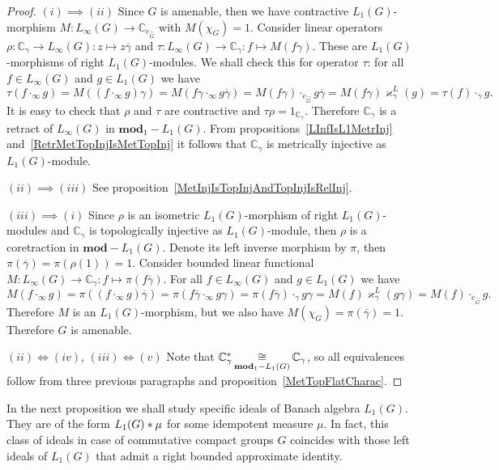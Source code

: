 \begin{proof} $(i)\implies (ii)$ Since $G$ is amenable, then we have
contractive $L_1(G)$-morphism $M:L_\infty(G)\to\mathbb{C}_{e_{\widehat{G}}}$
with $M(\chi_G)=1$. Consider linear 
operators $\rho:\mathbb{C}_\gamma\to L_\infty(G):z\mapsto z\overline{\gamma}$ 
and $\tau:L_\infty(G)\to\mathbb{C}_\gamma:f\mapsto M(f\gamma)$. These are
$L_1(G)$-morphisms of right $L_1(G)$-modules. We shall check this for operator
$\tau$: for all $f\in L_\infty(G)$ and $g\in L_1(G)$ we have
$$
\tau(f\cdot_\infty g)
=M((f\cdot_\infty g)\gamma)
=M(f\gamma\cdot_\infty g\overline{\gamma})
=M(f\gamma)\cdot_{e_{\widehat{G}}} g\overline{\gamma}
=M(f\gamma)\varkappa_\gamma^L(g)
=\tau(f)\cdot_{\gamma} g.
$$  
It is easy to check that $\rho$ and $\tau$ are contractive and
$\tau\rho=1_{\mathbb{C}_\gamma}$. Therefore $\mathbb{C}_\gamma$ is a retract of
$L_\infty(G)$ in $\mathbf{mod}_1-L_1(G)$. From
propositions~\ref{LInfIsL1MetrInj} and~\ref{RetrMetTopInjIsMetTopInj} it follows
that $\mathbb{C}_\gamma$ is metrically injective as $L_1(G)$-module.

$(ii)\implies (iii)$ See proposition~\ref{MetInjIsTopInjAndTopInjIsRelInj}.

$(iii) \implies (i)$ Since $\rho$ is an isometric $L_1(G)$-morphism of right
$L_1(G)$-modules and $\mathbb{C}_\gamma$ is topologically injective as
$L_1(G)$-module, then $\rho$ is a coretraction in $\mathbf{mod}-L_1(G)$. Denote
its left inverse morphism by $\pi$, then
$\pi(\overline{\gamma})=\pi(\rho(1))=1$. Consider bounded linear functional
$M:L_\infty(G)\to\mathbb{C}_\gamma:f\mapsto \pi(f\overline{\gamma})$. For all
$f\in L_\infty(G)$ and $g\in L_1(G)$ we have
$$
M(f\cdot_\infty g)
=\pi((f\cdot_\infty g)\overline{\gamma})
=\pi(f\overline{\gamma}\cdot_\infty g\gamma)
=\pi(f\overline{\gamma})\cdot_{\gamma} g\gamma
=M(f)\varkappa_\gamma^L(g\gamma)
=M(f)\cdot_{e_{\widehat{G}}}g.
$$
Therefore $M$ is an $L_1(G)$-morphism, but we also have
$M(\chi_G)=\pi(\overline{\gamma})=1$. Therefore $G$ is amenable.

$(ii) \Longleftrightarrow (iv)$, $(iii) \Longleftrightarrow (v)$ Note that
$\mathbb{C}_\gamma^*\mathop{\mathbin{\cong}}\limits_{\mathbf{mod}_1-L_1(G)}\mathbb{C}_\gamma$, so all
equivalences  follow from three previous paragraphs and
proposition~\ref{MetTopFlatCharac}.
\end{proof}

In the next proposition we shall study specific ideals of Banach algebra
$L_1(G)$. They are of the form $L_1(G)\ast\mu$ for some idempotent measure
$\mu$. In fact, this class of ideals in case of commutative compact groups $G$
coincides with those left ideals of $L_1(G)$ that admit a right bounded
approximate identity.

